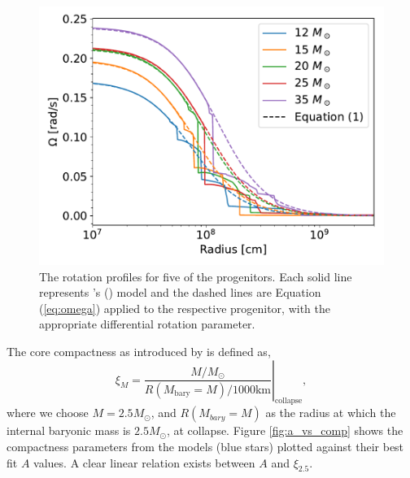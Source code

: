 \documentclass[twocolumn,times]{aastex62}  %
\begin{document}
\begin{figure}[t]
    \centering
    \includegraphics[scale=0.45]{figures/omega_vs_r.pdf}
    \caption{The rotation profiles for five of the \citet{heger:2005} progenitors.  Each solid line represents \citeauthor{heger:2005}'s (\citeyear{heger:2005}) model and the dashed lines are Equation (\ref{eq:omega}) applied to the respective progenitor, with the appropriate differential rotation parameter.  }
    \label{fig:ovsr}
\end{figure}

The core compactness as introduced by \citet{oconnor:2011} is defined as,
\begin{equation}
    \xi_M = \left.\frac{M/M_{\odot}}{R(M_\mathrm{bary}=M)/1000 \text{km}}\right\vert_\mathrm{collapse} ,
\end{equation} 
where we choose $M = 2.5 M_\odot$, and $R(M_{bary}=M) $ as the radius at which the internal baryonic mass is $2.5M_\odot$, at collapse.  
Figure \ref{fig:a_vs_comp} shows the compactness parameters from the \citet{heger:2005} models (blue stars) plotted against their best fit $A$ values.
A clear linear relation exists between $A$ and $\xi_{2.5}$.  
\end{document}
